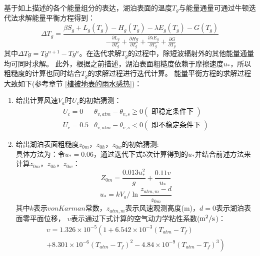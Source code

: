 基于如上描述的各个能量组分的表达，湖泊表面的温度$T_g$与能量通量可通过牛顿迭代法求解能量平衡方程得到：
\begin{equation}
\Delta T_{g}=\frac{\beta S_{g}+L_{g}\left(T_{g}\right)-H_{g}\left(T_{g}\right)
-\lambda E_{g}\left(T_{g}\right)-G\left(T_{g}\right)}{-\frac{\partial L_{g}}{\partial T_{g}}
+\frac{\partial H g}{\partial T_{g}}+\frac{\partial \lambda E_{g}}{\partial T_{g}}+\frac{\partial G}{\partial T_{g}}}
\end{equation}
其中$\Delta Tg=Tg^{n+1}-Tg^{n}$。在迭代求解$T_g$的过程中，除短波辐射外的其他能量通量均可同时求解。
此外，根据之前描述，湖泊表面粗糙度依赖于摩擦速度$u_\ast$，所以粗糙度的计算也同时结合$T_g$的求解过程进行迭代计算。
能量平衡方程的求解过程大致如下(参考章节 \ref{植被地表的雨水感热})：
\begin{enumerate}
    \item 给出计算风速$V_a$时$U_c$的初始猜测：
        \begin{equation}
        \begin{array}{cc}
            U_{c}=0 & \theta_{v, atm}-\theta_{v, s} \geq 0(\text { 即稳定条件下 }) \\
            U_{c}=0.5 & \theta_{v, atm}-\theta_{v, s}<0(\text { 即不稳定条件下 })
        \end{array}
        \end{equation}
    \item 给出湖泊表面粗糙度$z_{0m}$，$z_{0h}$，$z_{0w}$的初始猜测:\\
        具体方法为：令$u_\ast=0.06$，通过迭代下式5次计算得到的$u_\ast$并结合前述方法来计算$z_{0m}$，$z_{0h}$，$z_{0w}$：
        \begin{equation}
        Z_{0 m}=\frac{0.013 u_{*}^{2}}{g}+\frac{0.11 v}{u_{*}}
        \end{equation}
        \begin{equation}
        u_{*}=k V_{a} / \ln \frac{z_{atm, m}-d}{z_{0 m}}
        \end{equation}
        其中$k$表示$von Karman$常数，$z_{atm,m}$表示风速观测高度(m)，$d=0$表示湖泊表面零平面位移，
        $\upsilon$表示通过下式计算的空气动力学粘性系数($\rm m^2/s$)\citep{andreas1989thermal}：
        \begin{equation}
            \begin{array}{cc}
            \upsilon=1.326\times{10}^{-5}\left(1+6.542\times{10}^{-3}\left(T_{atm}-T_f\right)\right.\\
            \left.            +8.301\times{10}^{-6}\left(T_{atm}-T_f\right)^2-4.84\times{10}^{-9}\left(T_{atm}-T_f\right)^3\right)

\end{array}
\end{equation}
\end{enumerate}

